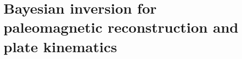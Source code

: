 \chapter{Bayesian inversion for paleomagnetic reconstruction and plate kinematics}
\label{chap:bayesian_plate_reconstruction}
